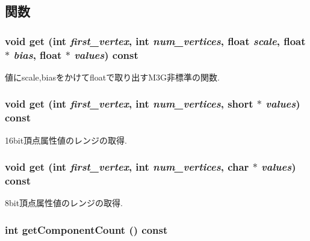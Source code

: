 \subsection{関数}
\hypertarget{classm3g_1_1VertexArray_1adedf59e0c6a047242a3914ca52b929}{
\subsubsection[{get}]{\setlength{\rightskip}{0pt plus 5cm}void get (int {\em first\_\-vertex}, \/  int {\em num\_\-vertices}, \/  float {\em scale}, \/  float $\ast$ {\em bias}, \/  float $\ast$ {\em values}) const}}
\label{classm3g_1_1VertexArray_1adedf59e0c6a047242a3914ca52b929}


値にscale,biasをかけてfloatで取り出すM3G非標準の関数. \hypertarget{classm3g_1_1VertexArray_575822f60d7b5e74ed51e94851123038}{
\subsubsection[{get}]{\setlength{\rightskip}{0pt plus 5cm}void get (int {\em first\_\-vertex}, \/  int {\em num\_\-vertices}, \/  short $\ast$ {\em values}) const}}
\label{classm3g_1_1VertexArray_575822f60d7b5e74ed51e94851123038}


16bit頂点属性値のレンジの取得. \hypertarget{classm3g_1_1VertexArray_9d1b801a7c196a07553a5ef4a5473573}{
\subsubsection[{get}]{\setlength{\rightskip}{0pt plus 5cm}void get (int {\em first\_\-vertex}, \/  int {\em num\_\-vertices}, \/  char $\ast$ {\em values}) const}}
\label{classm3g_1_1VertexArray_9d1b801a7c196a07553a5ef4a5473573}


8bit頂点属性値のレンジの取得. \hypertarget{classm3g_1_1VertexArray_7016f51d2788e78fdd736efd040f5e5e}{
\subsubsection[{getComponentCount}]{\setlength{\rightskip}{0pt plus 5cm}int getComponentCount () const}}
\label{classm3g_1_1VertexArray_7016f51d2788e78fdd736efd040f5e5e}


